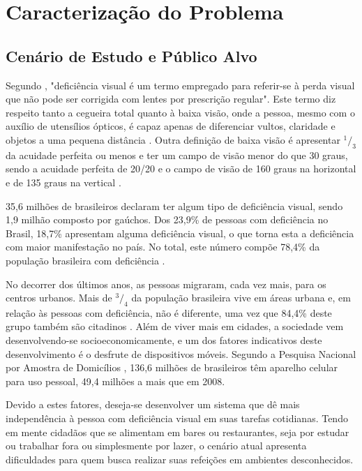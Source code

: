 \chapter{\label{chap:caract}Caracterização do Problema}

\section{Cenário de Estudo e Público Alvo}

Segundo \cite{MOURA2006}, "deficiência visual é um termo empregado para referir-se à perda visual que não pode ser corrigida com lentes por prescrição regular". Este termo diz respeito tanto a cegueira total quanto à baixa visão, onde a pessoa, mesmo com o auxílio de utensílios ópticos, é capaz apenas de diferenciar vultos, claridade e objetos a uma pequena distância \cite{TVESCOLA}. Outra definição de baixa visão é apresentar $^1/_3$ da acuidade perfeita ou menos e ter um campo de visão menor do que 30 graus, sendo a acuidade perfeita de 20/20 e o campo de visão de 160 graus na horizontal e de 135 graus na vertical \cite{ERGO2015}.

35,6 milhões de brasileiros declaram ter algum tipo de deficiência visual, sendo 1,9 milhão composto por gaúchos. Dos 23,9\% de pessoas com deficiência no Brasil, 18,7\% apresentam alguma deficiência visual, o que torna esta a deficiência com maior manifestação no país. No total, este número compõe 78,4\% da população brasileira com deficiência \cite{IBGE2010}.

No decorrer dos últimos anos, as pessoas migraram, cada vez mais, para os centros urbanos. Mais de $^3/_4$ da população brasileira vive em áreas urbana \cite{IBGE2011} e, em relação às pessoas com deficiência, não é diferente, uma vez que 84,4\% deste grupo também são citadinos \cite{IBGE2010}. Além de viver mais em cidades, a sociedade vem desenvolvendo-se socioeconomicamente, e um dos fatores indicativos deste desenvolvimento é o desfrute de dispositivos móveis. Segundo a Pesquisa Nacional por Amostra de Domicílios \cite{PNAD2014}, 136,6 milhões de brasileiros têm aparelho celular para uso pessoal, 49,4 milhões a mais que em 2008. 

Devido a estes fatores, deseja-se desenvolver um sistema que dê mais independência à pessoa com deficiência visual em suas tarefas cotidianas. Tendo em mente cidadãos que se alimentam em bares ou restaurantes, seja por estudar ou trabalhar fora ou simplesmente por lazer, o cenário atual apresenta dificuldades para quem busca realizar suas refeições em ambientes desconhecidos. 

